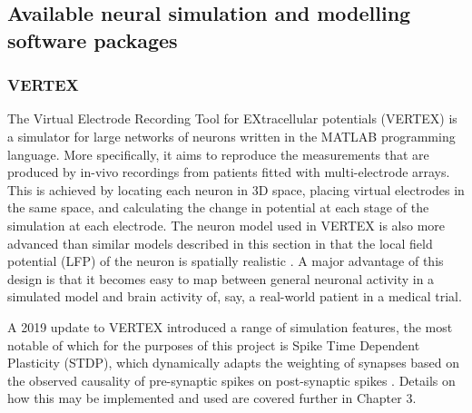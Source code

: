 \subsection{Available neural simulation and modelling software packages}

\subsubsection{VERTEX}
The Virtual Electrode Recording Tool for EXtracellular potentials (VERTEX) is a
simulator for large networks of neurons written in the MATLAB programming
language. More specifically, it aims to reproduce the measurements that are
produced by in-vivo recordings from patients fitted with multi-electrode
arrays. This is achieved by locating each neuron in 3D space, placing virtual
electrodes in the same space, and calculating the change in potential at each
stage of the simulation at each electrode. The neuron model used in VERTEX is
also more advanced than similar models described in this section in that the
local field potential (LFP) of the neuron is spatially realistic
\autocite{tomsett_virtual_2015}. A major advantage of this design is that it
becomes easy to map between general neuronal activity in a simulated model and
brain activity of, say, a real-world patient in a medical trial.

A 2019 update to VERTEX introduced a range of simulation features, the most
notable of which for the purposes of this project is Spike Time Dependent
Plasticity (STDP), which dynamically adapts the weighting of synapses based on
the observed causality of pre-synaptic spikes on post-synaptic spikes
\autocite{thornton_virtual_2019}. Details on how this may be implemented and
used are covered further in Chapter 3.

